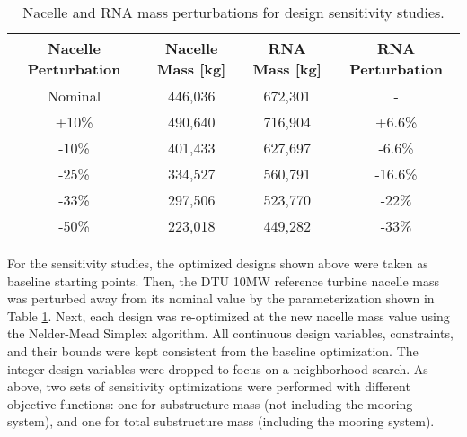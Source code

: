 \begin{table}[htbp]
  \begin{center}
    {\small
    \caption{Nacelle and RNA mass perturbations for design sensitivity studies.}
    \label{tbl:delta_rna}
    \begin{tabular}{cccc}
      \hline
      \textbf{Nacelle Perturbation} & \textbf{Nacelle Mass [\unit{kg}]} & \textbf{RNA Mass [\unit{kg}]} &
      \textbf{RNA Perturbation}\\ \hline \hline
      Nominal & 446,036 & 672,301 & -\\
      +10\% & 490,640 & 716,904 & +6.6\%\\
      -10\% & 401,433 & 627,697 & -6.6\%\\
      -25\% & 334,527 & 560,791 & -16.6\%\\
      -33\% & 297,506 & 523,770 & -22\%\\
      -50\% & 223,018 & 449,282 & -33\%\\ \hline
    \end{tabular}
    }
  \end{center}
\end{table}

For the sensitivity studies, the optimized designs shown above were
taken as baseline starting points.  Then, the DTU 10MW reference turbine
nacelle mass was perturbed away from its nominal value by the
parameterization shown in Table \ref{tbl:delta_rna}.  Next, each design
was re-optimized at the new nacelle mass value using the Nelder-Mead
Simplex algorithm.  All continuous design variables, constraints, and
their bounds were kept consistent from the baseline optimization.  The
integer design variables were dropped to focus on a neighborhood search.
As above, two sets of sensitivity optimizations were performed with
different objective functions: one for substructure mass (not including
the mooring system), and one for total substructure mass (including the
mooring system).

